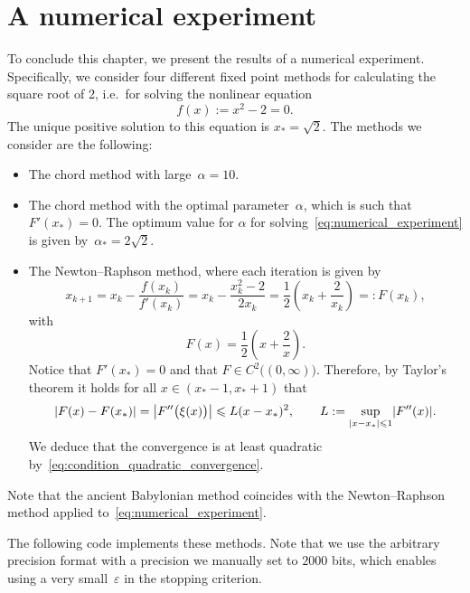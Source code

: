 \section{A numerical experiment}
To conclude this chapter,
we present the results of a numerical experiment.
Specifically,
we consider four different fixed point methods for calculating the square root of 2,
i.e.\ for solving the nonlinear equation
\begin{equation}
    \label{eq:numerical_experiment}
    f(x) := x^2 - 2 = 0.
\end{equation}
The unique positive solution to this equation is $x_* = \sqrt{2}$.
The methods we consider are the following:
\begin{itemize}
    \item
        The chord method with large~$\alpha = 10$.

    \item
        The chord method with the optimal parameter~$\alpha$,
        which is such that $F'(x_*) = 0$.
        The optimum value for $\alpha$ for solving~\eqref{eq:numerical_experiment} is given by~$\alpha_* = 2 \sqrt{2}$.

    \item
        The Newton--Raphson method,
        where each iteration is given by
        \[
            x_{k+1} = x_k - \frac{f(x_k)}{f'(x_k)} = x_k - \frac{x_k^2 - 2}{2x_k} = \frac{1}{2} \left(x_k + \frac{2}{x_k} \right)
            =: F(x_k),
        \]
        with
        \[
            F(x) = \frac{1}{2} \left(x + \frac{2}{x} \right).
        \]
        Notice that $F'(x_*) = 0$ and that $F \in C^2\bigl((0, \infty)\bigr)$.
        Therefore, by Taylor's theorem it holds for all $x \in (x_*-1, x_* + 1)$ that
        \[
            \left\lvert F(x) - F(x_*) \right\rvert
            = \left\lvert F''\bigl(\xi(x)\bigr) \right\rvert
            \leqslant L (x - x_*)^2,
            \qquad L:= \sup_{\lvert x - x_*\rvert \leqslant 1} \lvert F''(x)\rvert.
        \]
        We deduce that the convergence is at least quadratic by~\eqref{eq:condition_quadratic_convergence}.
\end{itemize}
\begin{remark}
    Note that the ancient Babylonian method coincides with the Newton--Raphson method applied to~\eqref{eq:numerical_experiment}.
\end{remark}
The following code implements these methods.
Note that we use the arbitrary precision  format with a precision we manually set to $2000$ bits,
which enables using a very small~$\varepsilon$ in the stopping criterion.
